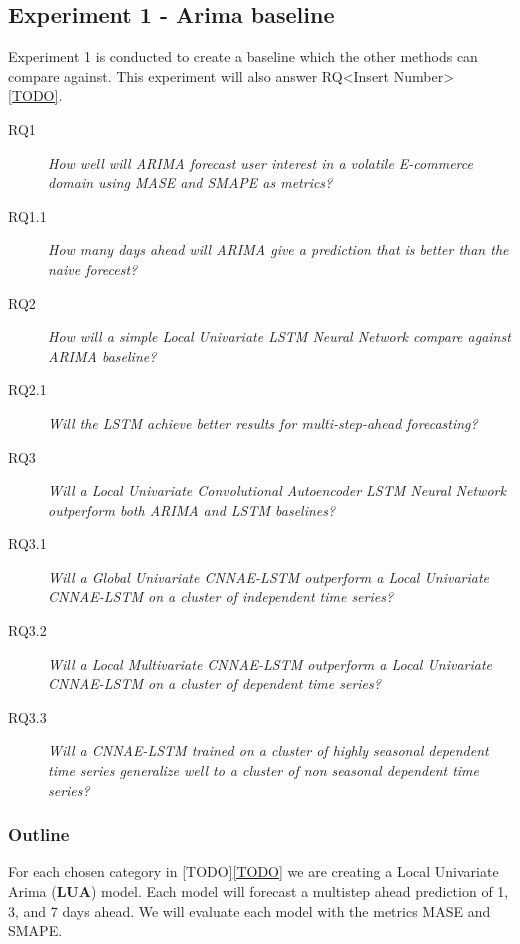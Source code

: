\subsection{Experiment 1 - Arima baseline}
\label{section:Method:Experiment1-Arima}

Experiment 1 is conducted to create a baseline which
the other methods can compare against. This experiment will also
answer RQ<Insert Number> \cref{TODO}.



\begin{description}
  \item[RQ1]{\it How well will ARIMA forecast user interest in a volatile E-commerce domain using MASE and SMAPE as metrics?}
  \item[RQ1.1]{\it How many days ahead will ARIMA give a prediction that is better than the naive forecest?}
\end{description}
\begin{description}
  \item[RQ2]{\it How will a simple Local Univariate LSTM Neural Network compare against ARIMA baseline?}
  \item[RQ2.1]{\it Will the LSTM achieve better results for multi-step-ahead forecasting?}
\end{description}
\begin{description}
  \item[RQ3]{\it Will a Local Univariate Convolutional Autoencoder LSTM Neural Network outperform both ARIMA and LSTM baselines?}
  \item[RQ3.1]{\it Will a Global Univariate CNNAE-LSTM outperform a Local Univariate CNNAE-LSTM on a cluster of independent time series?}
  \item[RQ3.2]{\it Will a Local Multivariate CNNAE-LSTM outperform a Local Univariate CNNAE-LSTM on a cluster of dependent time series?}
  \item[RQ3.3]{\it Will a CNNAE-LSTM trained on a cluster of highly seasonal dependent time series generalize well to a cluster of non seasonal dependent time series?}
\end{description}

\subsubsection{Outline}
For each chosen category in [TODO]\cref{TODO} we are creating a Local Univariate Arima (\textbf{LUA})
model. Each model will forecast a multistep ahead prediction of 1, 3, and 7 days ahead.
We will evaluate each model with the metrics MASE and SMAPE.


